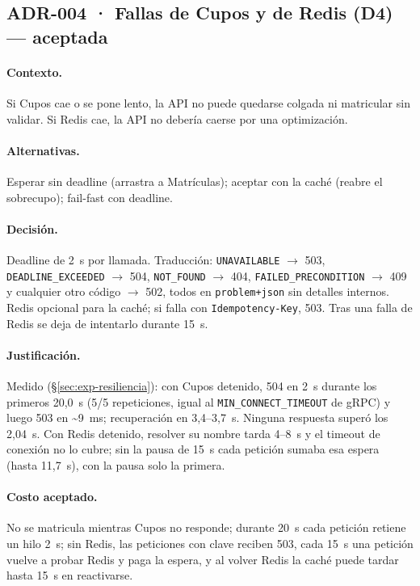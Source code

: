 \documentclass[11pt,spanish]{article}
\begin{document}
\subsection*{ADR-004 · Fallas de Cupos y de Redis (D4) — aceptada}

\paragraph{Contexto.} Si Cupos cae o se pone lento, la API no puede quedarse colgada ni matricular sin validar. Si Redis cae, la API no debería caerse por una optimización.

\paragraph{Alternativas.} Esperar sin deadline (arrastra a Matrículas); aceptar con la caché (reabre el sobrecupo); fail-fast con deadline.

\paragraph{Decisión.} Deadline de 2~s por llamada. Traducción: \texttt{UNAVAILABLE} $\to$ 503, \texttt{DEADLINE\_EXCEEDED} $\to$ 504, \texttt{NOT\_FOUND} $\to$ 404, \texttt{FAILED\_PRECONDITION} $\to$ 409 y cualquier otro código $\to$ 502, todos en \texttt{problem+json} sin detalles internos. Redis opcional para la caché; si falla con \texttt{Idempotency-Key}, 503. Tras una falla de Redis se deja de intentarlo durante 15~s.

\paragraph{Justificación.} Medido (\S\ref{sec:exp-resiliencia}): con Cupos detenido, 504 en 2~s durante los primeros 20,0~s (5/5 repeticiones, igual al \texttt{MIN\_CONNECT\_TIMEOUT} de gRPC) y luego 503 en \textasciitilde 9~ms; recuperación en 3,4--3,7~s. Ninguna respuesta superó los 2,04~s. Con Redis detenido, resolver su nombre tarda 4--8~s y el timeout de conexión no lo cubre; sin la pausa de 15~s cada petición sumaba esa espera (hasta 11,7~s), con la pausa solo la primera.

\paragraph{Costo aceptado.} No se matricula mientras Cupos no responde; durante 20~s cada petición retiene un hilo 2~s; sin Redis, las peticiones con clave reciben 503, cada 15~s una petición vuelve a probar Redis y paga la espera, y al volver Redis la caché puede tardar hasta 15~s en reactivarse.
\end{document}
